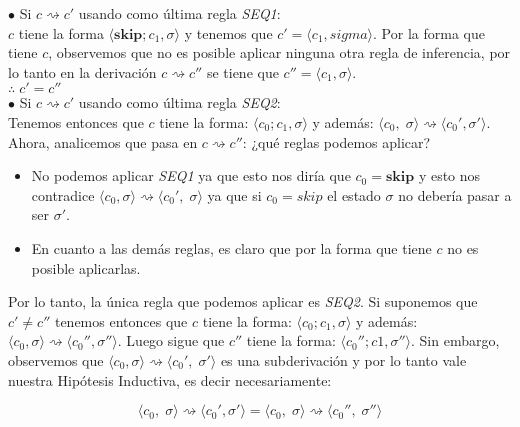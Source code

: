 \documentclass[11pt, fleqn]{article}
\begin{document}

$\bullet$ Si $ c \rightsquigarrow c' $ usando como última regla \emph{SEQ1}: \\
$c$ tiene la forma $\langle \textbf{skip};c_1, \sigma \rangle$ y tenemos que $c' = \langle c_1, sigma \rangle$.
Por la forma que tiene $c$, observemos que no es posible aplicar ninguna otra regla
de inferencia, por lo tanto en la derivación $ c \rightsquigarrow c'' $ se tiene que
$c'' = \langle c_1, \sigma \rangle$. \\

$\therefore \; c' = c''$ \\


$\bullet$ Si $ c \rightsquigarrow c' $ usando como última regla \emph{SEQ2}: \\
Tenemos entonces que $c$ tiene la forma: $\langle c_0;c_1, \sigma \rangle$ y
además:  $ \langle c_0, \; \sigma \rangle \rightsquigarrow \langle c_0', \sigma' \rangle$.
Ahora, analicemos que pasa en $ c \rightsquigarrow c'' $: ¿qué reglas podemos aplicar?

\begin{itemize}
      \item No podemos aplicar \emph{SEQ1} ya que esto nos diría que $c_0 = \textbf{skip}$ y esto
            nos contradice $ \langle c_0, \sigma \rangle \rightsquigarrow \langle c_0', \; \sigma \rangle$ ya que
            si $c_0 = skip$ el estado $\sigma$ no debería pasar a ser $\sigma'$.
      \item En cuanto a las demás reglas, es claro que por la forma que tiene $c$ no es
            posible aplicarlas.
\end{itemize}

Por lo tanto, la única regla que podemos aplicar es \emph{SEQ2}. Si suponemos que 
$c' \neq c''$ tenemos entonces que $c$ tiene la forma: $\langle c_0;c_1,\sigma \rangle$ y
además:  $ \langle c_0, \sigma \rangle \rightsquigarrow \langle c_0'', \sigma'' \rangle$.
Luego sigue que $c''$ tiene la forma: $ \langle c_0'';c1, \sigma'' \rangle$.
Sin embargo, observemos que $ \langle c_0, \sigma \rangle \rightsquigarrow \langle c_0', \; \sigma' \rangle$
es una subderivación y por lo tanto vale nuestra Hipótesis Inductiva, es decir necesariamente:

\begin{equation*}
 \langle c_0, \; \sigma \rangle \rightsquigarrow \langle c_0', \sigma' \rangle = \langle c_0, \; \sigma \rangle \rightsquigarrow \langle c_0'', \; \sigma'' \rangle
\end{equation*}
\end{document}
